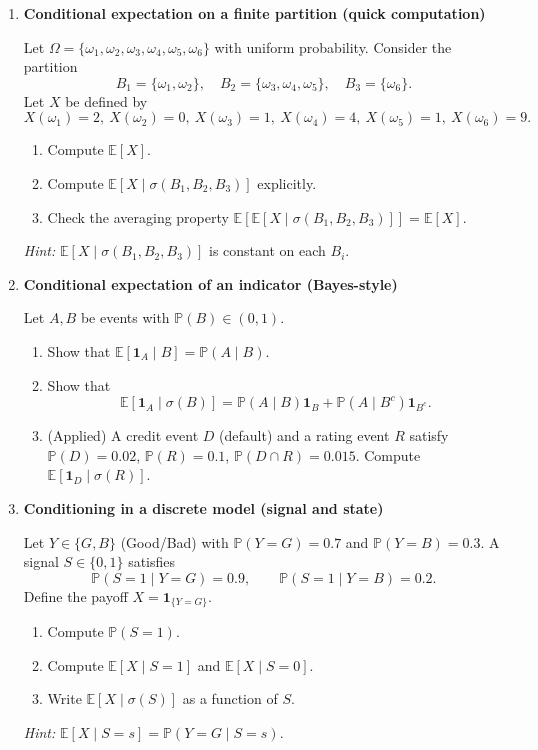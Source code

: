 \documentclass[11pt]{article}
\begin{document}
\begin{enumerate}

\item \textbf{Conditional expectation on a finite partition (quick computation)}

Let $\Omega=\{\omega_1,\omega_2,\omega_3,\omega_4,\omega_5,\omega_6\}$ with uniform probability.
Consider the partition
\[
B_1=\{\omega_1,\omega_2\},\quad B_2=\{\omega_3,\omega_4,\omega_5\},\quad B_3=\{\omega_6\}.
\]
Let $X$ be defined by
\[
X(\omega_1)=2,\ X(\omega_2)=0,\ X(\omega_3)=1,\ X(\omega_4)=4,\ X(\omega_5)=1,\ X(\omega_6)=9.
\]
\begin{enumerate}
\item Compute $\mathbb{E}[X]$.
\item Compute $\mathbb{E}[X\mid \sigma(B_1,B_2,B_3)]$ explicitly.
\item Check the averaging property $\mathbb{E}[\mathbb{E}[X\mid\sigma(B_1,B_2,B_3)]]=\mathbb{E}[X]$.
\end{enumerate}
\emph{Hint:} $\mathbb{E}[X\mid\sigma(B_1,B_2,B_3)]$ is constant on each $B_i$.

\bigskip

\item \textbf{Conditional expectation of an indicator (Bayes-style)}

Let $A,B$ be events with $\mathbb{P}(B)\in(0,1)$.
\begin{enumerate}
\item Show that $\mathbb{E}[\mathbf{1}_A\mid B]=\mathbb{P}(A\mid B)$.
\item Show that
\[
\mathbb{E}[\mathbf{1}_A\mid \sigma(B)]
=
\mathbb{P}(A\mid B)\mathbf{1}_B+\mathbb{P}(A\mid B^c)\mathbf{1}_{B^c}.
\]
\item (Applied) A credit event $D$ (default) and a rating event $R$ satisfy
$\mathbb{P}(D)=0.02$, $\mathbb{P}(R)=0.1$, $\mathbb{P}(D\cap R)=0.015$.
Compute $\mathbb{E}[\mathbf{1}_D\mid \sigma(R)]$.
\end{enumerate}

\bigskip

\item \textbf{Conditioning in a discrete model (signal and state)}

Let $Y\in\{G,B\}$ (Good/Bad) with $\mathbb{P}(Y=G)=0.7$ and $\mathbb{P}(Y=B)=0.3$.
A signal $S\in\{0,1\}$ satisfies
\[
\mathbb{P}(S=1\mid Y=G)=0.9,\qquad \mathbb{P}(S=1\mid Y=B)=0.2.
\]
Define the payoff $X=\mathbf{1}_{\{Y=G\}}$.
\begin{enumerate}
\item Compute $\mathbb{P}(S=1)$.
\item Compute $\mathbb{E}[X\mid S=1]$ and $\mathbb{E}[X\mid S=0]$.
\item Write $\mathbb{E}[X\mid \sigma(S)]$ as a function of $S$.
\end{enumerate}
\emph{Hint:} $\mathbb{E}[X\mid S=s]=\mathbb{P}(Y=G\mid S=s)$.


\end{enumerate}
\end{document}
